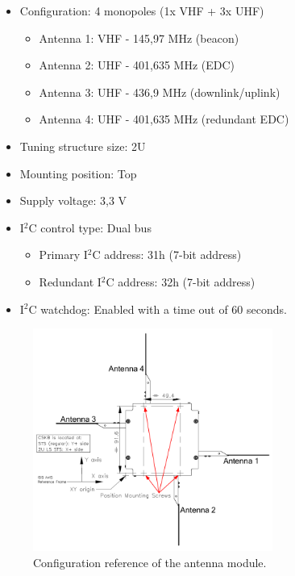 \begin{itemize}
    \item Configuration: 4 monopoles (1x VHF + 3x UHF)
        \begin{itemize}
            \item Antenna 1: VHF - 145,97 MHz (beacon)
            \item Antenna 2: UHF - 401,635 MHz (EDC)
            \item Antenna 3: UHF - 436,9 MHz (downlink/uplink)
            \item Antenna 4: UHF - 401,635 MHz (redundant EDC)
        \end{itemize}
    \item Tuning structure size: 2U
    \item Mounting position: Top
    \item Supply voltage: 3,3 V
    \item I$^{2}$C control type: Dual bus
        \begin{itemize}
            \item Primary I$^{2}$C address: 31h (7-bit address)
            \item Redundant I$^{2}$C address: 32h (7-bit address)
        \end{itemize}
    \item I$^{2}$C watchdog: Enabled with a time out of 60 seconds.
\end{itemize}

\begin{figure}[!ht]
    \begin{center}
        \includegraphics[width=0.7\textwidth]{figures/isis-antenna-ref}
        \caption{Configuration reference of the antenna module.}
        \label{fig:isis-antenna-ref}
    \end{center}
\end{figure}

